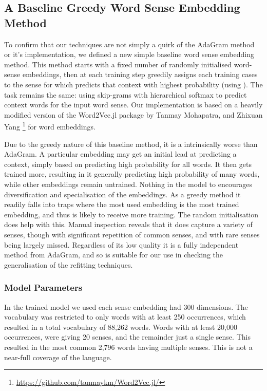 \documentclass{sig-alternate}
\begin{document}
\subsection{A Baseline Greedy Word Sense Embedding Method}

To confirm that our techniques are not simply a quirk of the AdaGram method or it's implementation, we defined a new simple baseline word sense embedding method.
This method starts with a fixed number of randomly initialised word-sense embeddings, then at each training step greedily assigns each training cases to the sense for which predicts that context with highest probability (using ). The task remains the same: using skip-grams with hierarchical softmax to predict context words for the input word sense.
Our implementation is based on a heavily modified version of the Word2Vec.jl package by Tanmay Mohapatra, and Zhixuan Yang \footnote{\url{https://github.com/tanmaykm/Word2Vec.jl/}} for word embeddings.

Due to the greedy nature of this baseline method, it is a intrinsically worse than AdaGram. A particular embedding may get an initial lead at predicting a context, simply based on predicting high probability for all words. It then gets trained more, resulting in it generally predicting high probability of many words, while other embeddings remain untrained. Nothing in the model to encourages diversification and specialisation of the embeddings. As a greedy method it readily falls into traps where the most used embedding is the most trained embedding, and thus is likely to receive more training. The random initialisation does help with this. Manual inspection reveals that it does capture a variety of senses, though with significant repetition of common senses, and with rare senses being largely missed. Regardless of its low quality it is a fully independent method from AdaGram, and so is suitable for our use in checking the generalisation of the refitting techniques.
\subsubsection{Model Parameters}

In the trained model we used each sense embedding had 300 dimensions.
The vocabulary was restricted to only words with at least 250 occurrences, which resulted in a total vocabulary of 88,262 words. Words with at least 20,000 occurrences, were giving 20 senses, and the remainder just a single sense. This resulted in the most common 2,796 words having multiple senses. This is not a near-full coverage of the language. 
\end{document}
